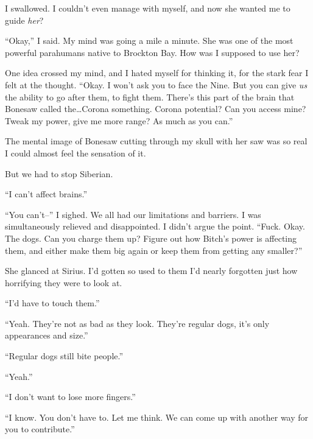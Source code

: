 I swallowed.  I couldn't even manage with myself, and now she wanted me to guide \emph{her}?



``Okay,'' I said.  My mind was going a mile a minute.  She was one of the most powerful parahumans native to Brockton Bay.  How was I supposed to use her?



One idea crossed my mind, and I hated myself for thinking it, for the stark fear I felt at the thought.  ``Okay.  I won't ask you to face the Nine.  But you can give \emph{us} the ability to go after them, to fight them.  There's this part of the brain that Bonesaw called the\ldots Corona something.  Corona potential?  Can you access mine?  Tweak my power, give me more range?  As much as you can.''



The mental image of Bonesaw cutting through my skull with her saw was so real I could almost feel the sensation of it.



But we had to stop Siberian.



``I can't affect brains.''



``You can't--''  I sighed.  We all had our limitations and barriers.  I was simultaneously relieved and disappointed.  I didn't argue the point.  ``Fuck.  Okay.  The dogs.  Can you charge them up?  Figure out how Bitch's power is affecting them, and either make them big again or keep them from getting any smaller?''



She glanced at Sirius.  I'd gotten so used to them I'd nearly forgotten just how horrifying they were to look at.



``I'd have to touch them.''



``Yeah.  They're not as bad as they look.  They're regular dogs, it's only appearances and size.''



``Regular dogs still bite people.''



``Yeah.''



``I don't want to lose more fingers.''



``I know.  You don't have to.  Let me think.  We can come up with another way for you to contribute.''



